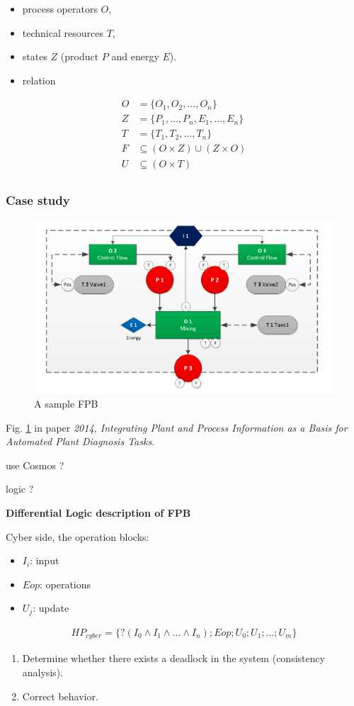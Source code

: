 \begin{itemize}
  \item process operators $O$,
  \item technical resources $T$,
  \item states $Z$ (product $P$ and energy $E$).
  \item relation 
\end{itemize}

\begin{align*}
  O &= \{O_1, O_2, \dots, O_n\} \\
  Z &= \{P_1, \dots, P_n, E_1, \dots, E_n\} \\
  T &= \{T_1, T_2, \dots, T_n\} \\
  F &\subseteq (O \times Z) \cup (Z \times O) \\
  U &\subseteq (O \times T) \\
\end{align*}

\subsubsection{Case study}

\begin{figure}
  \centering
  \includegraphics[width=.8\textwidth]{notes/project/AITOC-2020/img/FPB.png}
  \caption{A sample FPB}
  \label{fig:aitoc-wp1-as-fpb}
\end{figure}

Fig. \ref{fig:aitoc-wp1-as-fpb} in paper \textit{2014, Integrating Plant and 
  Process Information as a Basis for Automated Plant Diagnosis Tasks}.

use Cosmos ?

logic ?

\textbf{Differential Logic description of FPB}

Cyber side, the operation blocks:

\begin{itemize}
  \item $I_i$: input
  \item $Eop$: operations
  \item $U_j$: update
\end{itemize}

\begin{align*}
  HP_{cyber} = \{?(I_0 \wedge I_1 \wedge \dots \wedge I_n);
    Eop; U_0; U_1; \dots; U_m\}  
\end{align*}

\begin{enumerate}
  \item Determine whether there exists a deadlock in the system 
    (consistency analysis).
  \item Correct behavior.
\end{enumerate}

